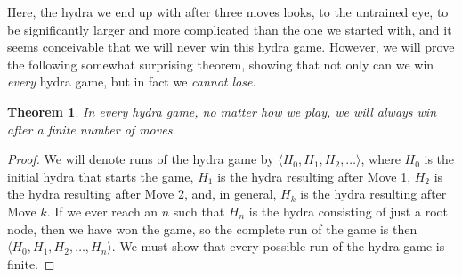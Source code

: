 \documentclass[a4paper]{memoir}
\newtheorem{theorem}{Theorem}[section]
\theoremstyle{definition}
\begin{document}
Here, the hydra we end up with after three moves looks, to the untrained eye, to be 
significantly larger and more complicated than the one we started with, and it seems 
conceivable that we will never win this hydra game. However, we will prove the following 
somewhat surprising theorem, showing that not only can we win \emph{every} hydra game, but 
in fact we \emph{cannot lose}.

\begin{theorem}
  In every hydra game, no matter how we play, we will always win after a finite number of moves.
\end{theorem}

\begin{proof}
  We will denote runs of the hydra game by $\langle H_0, H_1, H_2, \ldots \rangle$, where 
  $H_0$ is the initial hydra that starts the game, $H_1$ is the hydra resulting after Move 1, 
  $H_2$ is the hydra resulting after Move 2, and, in general, $H_k$ is the hydra resulting after 
  Move $k$. If we ever reach an $n$ such that $H_n$ is the hydra consisting of just a root node, 
  then we have won the game, so the complete run of the game is then 
  $\langle H_0, H_1, H_2, \ldots, H_n \rangle$. We must show that every possible run of the hydra 
  game is finite.
  

\end{proof}
\end{document}
